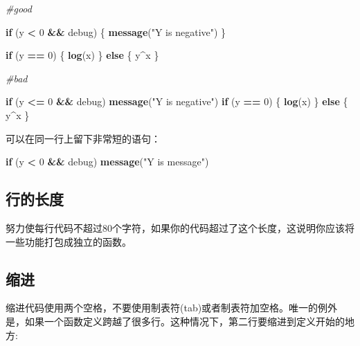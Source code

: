 \documentclass[]{book}
\newenvironment{Shaded}{\begin{snugshade}}{\end{snugshade}}
\newcommand{\KeywordTok}[1]{\textcolor[rgb]{0.13,0.29,0.53}{\textbf{#1}}}
\newcommand{\DecValTok}[1]{\textcolor[rgb]{0.00,0.00,0.81}{#1}}
\newcommand{\StringTok}[1]{\textcolor[rgb]{0.31,0.60,0.02}{#1}}
\newcommand{\CommentTok}[1]{\textcolor[rgb]{0.56,0.35,0.01}{\textit{#1}}}
\newcommand{\ControlFlowTok}[1]{\textcolor[rgb]{0.13,0.29,0.53}{\textbf{#1}}}
\newcommand{\OperatorTok}[1]{\textcolor[rgb]{0.81,0.36,0.00}{\textbf{#1}}}
\newcommand{\NormalTok}[1]{#1}
\begin{document}
\begin{Shaded}
\begin{Highlighting}[]
\CommentTok{#good}

\ControlFlowTok{if}\NormalTok{ (y }\OperatorTok{<}\StringTok{ }\DecValTok{0} \OperatorTok{&&}\StringTok{ }\NormalTok{debug) \{}
  \KeywordTok{message}\NormalTok{(}\StringTok{"Y is negative"}\NormalTok{)}
\NormalTok{\}}

\ControlFlowTok{if}\NormalTok{ (y }\OperatorTok{==}\StringTok{ }\DecValTok{0}\NormalTok{) \{}
  \KeywordTok{log}\NormalTok{(x)}
\NormalTok{\} }\ControlFlowTok{else}\NormalTok{ \{}
\NormalTok{  y}\OperatorTok{^}\NormalTok{x}
\NormalTok{\}}


\CommentTok{#bad}

\ControlFlowTok{if}\NormalTok{ (y }\OperatorTok{<=}\StringTok{ }\DecValTok{0} \OperatorTok{&&}\StringTok{ }\NormalTok{debug) }
\KeywordTok{message}\NormalTok{(}\StringTok{"Y is negative"}\NormalTok{)}
\ControlFlowTok{if}\NormalTok{ (y }\OperatorTok{==}\StringTok{ }\DecValTok{0}\NormalTok{) \{}
  \KeywordTok{log}\NormalTok{(x)}
\NormalTok{\}}
\ControlFlowTok{else}\NormalTok{ \{}
\NormalTok{  y}\OperatorTok{^}\NormalTok{x}
\NormalTok{\}}
\end{Highlighting}
\end{Shaded}

可以在同一行上留下非常短的语句：

\begin{Shaded}
\begin{Highlighting}[]
\ControlFlowTok{if}\NormalTok{ (y }\OperatorTok{<}\StringTok{ }\DecValTok{0} \OperatorTok{&&}\StringTok{ }\NormalTok{debug) }\KeywordTok{message}\NormalTok{(}\StringTok{"Y is message"}\NormalTok{)}
\end{Highlighting}
\end{Shaded}

\subsection{行的长度}

努力使每行代码不超过80个字符，如果你的代码超过了这个长度，这说明你应该将一些功能打包成独立的函数。

\subsection{缩进}

缩进代码使用两个空格，不要使用制表符(tab)或者制表符加空格。唯一的例外是，如果一个函数定义跨越了很多行。这种情况下，第二行要缩进到定义开始的地方:
\end{document}
